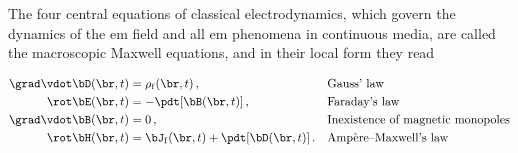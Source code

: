 
The four central equations of classical electrodynamics, which govern the dynamics of the \gls{em} field and all \gls{em} phenomena in continuous media, are called the macroscopic Maxwell equations, and in their local form they read~\cite{Jackson:electrodynamics,Loureiro_Elementos_de_ECLA}

\begin{subequations}
    \begin{align}
        \grad \vdot \bD  (\br,t) &= \rho_\f (\br,t)\,, &  &\text{Gauss' law}  \label{subeq:Gauss_law} \\
        \rot \bE  (\br,t) &= -\pdt[\bB (\br,t)]\,, & &\text{Faraday's law}\ \label{subeq:Faraday_law}\\
         \grad \vdot \bB  (\br,t) &= 0\,, & &\text{Inexistence of magnetic monopoles} \label{subeq:no_magnetic_monopoles}\\
         \rot \bH (\br,t) &= \bJ_\f (\br,t) + \pdt[\bD (\br,t)]\,. & &\text{Amp\`ere--Maxwell's law} \label{subeq:Ampere_law}
    \end{align}
    \label{eq:Maxwells_equations}
\end{subequations}

